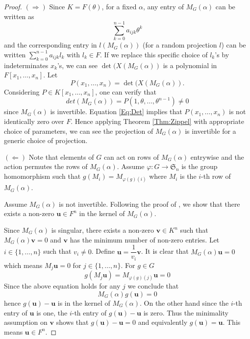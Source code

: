 \documentclass[sigconf]{acmart}
\theoremstyle{acmplain}
\begin{document}
\begin{proof}
$(\Rightarrow)$ Since $K = F(\theta)$, for a fixed $\alpha$, any entry of $M_G(\alpha)$ can be written as 
\begin{equation}\label{Eq:PrimElm}
\sum_{k= 0}^{n-1} a_{ijk}\theta^k
\end{equation}
 and the corresponding entry in $l(M_G(\alpha))$ (for a random projection $l$)
 can be written $\sum_{k= 0}^{n-1} a_{ijk}l_k$ with $l_k\in F$. If we replace this specific choice of $l_k$'s by 
 indeterminates $x_k$'s, we can see $\det(X(M_G(\alpha))$ is a polynomial in $F[x_1, \ldots, x_n].$ Let 
 $$P(x_1, \ldots, x_n) = \det(X(M_G(\alpha)).$$ 
 Considering $P \in K[x_1, \ldots , x_n]$, one can verify that 
 \begin{equation}\label{Eq:Det}
 det(M_G(\alpha))= P(1, \theta, \ldots, \theta^{n-1}) \neq 0
 \end{equation}
 since $M_G(\alpha)$ is invertible. Equation \ref{Eq:Det} implies that $P(x_1, \ldots, x_n)$ is not identically zero over $F$. Hence applying Theorem \ref{Thm:Zippel} with appropriate choice of parameters, we can see 
 the projection of $M_G(\alpha)$ is invertible for a generic choice of projection. 
 
 $(\Leftarrow)$  Note that elements of $G$ can act on 
 rows of $M_G(\alpha)$ entrywise and the action permutes the rows of $M_G(\alpha)$. Assume $\varphi : G \longrightarrow \mathfrak{S}_n$ is the group homomorphism 
 such that $g(M_i) = M_{\varphi(g)(i)}$ where $M_i$ is the $i$-th row of $M_G(\alpha)$.
 
 Assume $M_G(\alpha)$ is not invertible. Following the proof of \cite[Lemma 4]{Armin}, we show that there exists a non-zero $\textbf{u} \in F^n$ in the kernel of $M_G(\alpha)$. 
 
 Since $M_G(\alpha)$ is singular, there exists a non-zero $\textbf{v} \in K^n$  such that $M_G(\alpha)\textbf{v} = 0$ and $\textbf{v}$ has the minimum number of non-zero entries. Let $i \in  \lbrace 1, \ldots , n \rbrace$ such that $v_i \neq 0$. Define $\textbf{u} = \dfrac{1}{v_i}\textbf{v}$. It is clear  that $M_G(\alpha)\textbf{u} = 0$ which means $M_j \textbf{u} = 0 $ for $j \in \lbrace 1, \ldots, n \rbrace$. For $g \in G$
 \begin{equation}
  g(M_j \textbf{u}) = M_{\varphi(g)(j)} \textbf{u}= 0
 \end{equation}
 Since the above equation holds for any $j$ we conclude that $$M_G(\alpha)g(\textbf{u})= 0$$ hence
 $g(\textbf{u})-\textbf{u}$ is in the kernel of $M_G(\alpha)$. On the other hand since the $i$-th entry 
 of $\textbf{u}$ is one, the $i$-th entry of $g(\textbf{u}) -\textbf{u}$ is zero. Thus the minimality assumption
 on $\textbf{v}$ shows that $g(\textbf{u}) -\textbf{u} = 0$ and equivalently $g(\textbf{u})=\textbf{u}$. This 
 means $\textbf{u} \in F^n$.
 

\end{proof}
\end{document}
